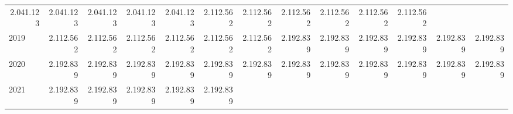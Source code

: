 \begin{tabular}{lllllllllllll}
  \multicolumn{1}{r}{2.041.123} &
  \multicolumn{1}{r}{2.041.123} &
  \multicolumn{1}{r}{2.041.123} &
  \multicolumn{1}{r}{2.041.123} &
  \multicolumn{1}{r}{2.041.123} &
  \multicolumn{1}{r}{2.112.562} &
  \multicolumn{1}{r}{2.112.562} &
  \multicolumn{1}{r}{2.112.562} &
  \multicolumn{1}{r}{2.112.562} &
  \multicolumn{1}{r}{2.112.562} &
  \multicolumn{1}{r}{2.112.562} \\
\multicolumn{1}{l}{\hspace{1em}2019} &
  \multicolumn{1}{|r}{2.112.562} &
  \multicolumn{1}{r}{2.112.562} &
  \multicolumn{1}{r}{2.112.562} &
  \multicolumn{1}{r}{2.112.562} &
  \multicolumn{1}{r}{2.112.562} &
  \multicolumn{1}{r}{2.112.562} &
  \multicolumn{1}{r}{2.192.839} &
  \multicolumn{1}{r}{2.192.839} &
  \multicolumn{1}{r}{2.192.839} &
  \multicolumn{1}{r}{2.192.839} &
  \multicolumn{1}{r}{2.192.839} &
  \multicolumn{1}{r}{2.192.839} \\
\multicolumn{1}{l}{\hspace{1em}2020} &
  \multicolumn{1}{|r}{2.192.839} &
  \multicolumn{1}{r}{2.192.839} &
  \multicolumn{1}{r}{2.192.839} &
  \multicolumn{1}{r}{2.192.839} &
  \multicolumn{1}{r}{2.192.839} &
  \multicolumn{1}{r}{2.192.839} &
  \multicolumn{1}{r}{2.192.839} &
  \multicolumn{1}{r}{2.192.839} &
  \multicolumn{1}{r}{2.192.839} &
  \multicolumn{1}{r}{2.192.839} &
  \multicolumn{1}{r}{2.192.839} &
  \multicolumn{1}{r}{2.192.839} \\
\multicolumn{1}{l}{\hspace{1em}2021} &
  \multicolumn{1}{|r}{2.192.839} &
  \multicolumn{1}{r}{2.192.839} &
  \multicolumn{1}{r}{2.192.839} &
  \multicolumn{1}{r}{2.192.839} &
  \multicolumn{1}{r}{2.192.839} &
  \multicolumn{1}{r}{} &
  \multicolumn{1}{r}{} &
  \multicolumn{1}{r}{} &
  \multicolumn{1}{r}{} &
  \multicolumn{1}{r}{} &
  \multicolumn{1}{r}{} &
  \multicolumn{1}{r}{} \\
\cline{1-13}
\end{tabular}
